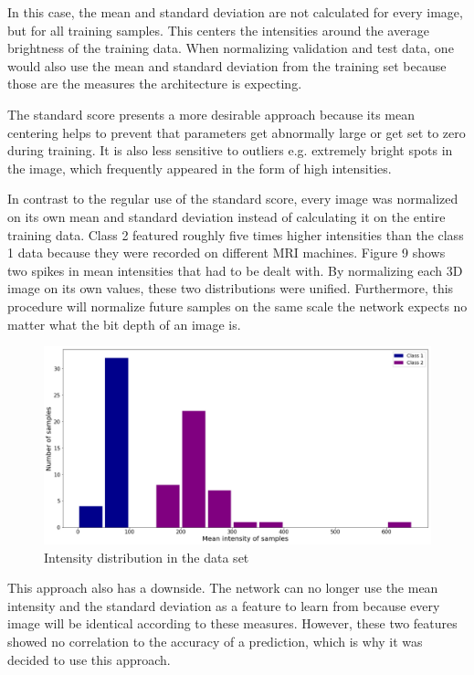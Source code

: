 In this case, the mean and standard deviation are not calculated for every image, but for all training samples. This centers the intensities around the average brightness of the training data. When normalizing validation and test data, one would also use the mean and standard deviation from the training set because those are the measures the architecture is expecting.

The standard score presents a more desirable approach because its mean centering helps to prevent that parameters get abnormally large or get set to zero during training. It is also less sensitive to outliers e.g. extremely bright spots in the image, which frequently appeared in the form of high intensities.

In contrast to the regular use of the standard score, every image was normalized on its own mean and standard deviation instead of calculating it on the entire training data. Class 2 featured roughly five times higher intensities than the class 1 data because they were recorded on different MRI machines. Figure 9 shows two spikes in mean intensities that had to be dealt with. By normalizing each 3D image on its own values, these two distributions were unified. Furthermore, this procedure will normalize future samples on the same scale the network expects no matter what the bit depth of an image is.

\begin{figure}[H]
\centering
\par
\includegraphics[width=1.0\textwidth]{imgs/intensity_distr.png}
\caption{Intensity distribution in the data set}
\par
\end{figure}

This approach also has a downside. The network can no longer use the mean intensity and the standard deviation as a feature to learn from because every image will be identical according to these measures. However, these two features showed no correlation to the accuracy of a prediction, which is why it was decided to use this approach.


